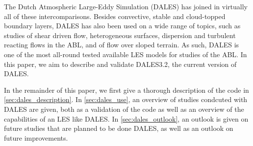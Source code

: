 The Dutch Atmospheric Large-Eddy Simulation (DALES) has joined in virtually all of these intercomparisons. Besides convective, stable and cloud-topped boundary layers, DALES has also been used on a wide range of topics, such as studies of shear driven flow, heterogeneous surfaces,  dispersion and turbulent reacting flows in the ABL, and of flow over sloped terrain. As such, DALES is one of the most all-round tested available LES models for studies of the ABL. In this paper, we aim to describe and validate DALES3.2, the current version of DALES.

In the remainder of this paper, we first give a thorough description of the code in \secnm \ref{sec:dales_description}. In \secnm \ref{sec:dales_use}, an overview of studies condcuted with DALES are given, both as a validation of the code as well as an overview of the capabilities of an LES like DALES. In \secnm \ref{sec:dales_outlook}, an outlook is given on future studies that are planned to be done DALES, as well as an outlook on future improvements.
